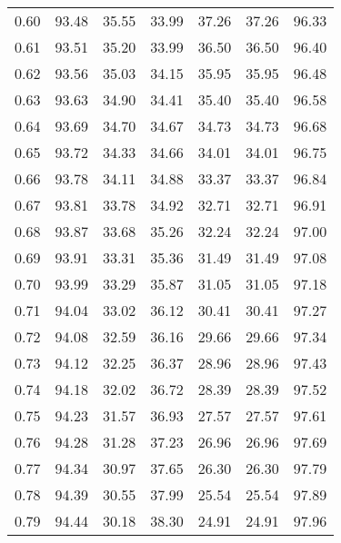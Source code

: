 \begin{tabular}{|c|c|c|c|c|c|c|}
      0.60 &     93.48 &     35.55 &      33.99 &   37.26 &      37.26 &         96.33 \\
      0.61 &     93.51 &     35.20 &      33.99 &   36.50 &      36.50 &         96.40 \\
      0.62 &     93.56 &     35.03 &      34.15 &   35.95 &      35.95 &         96.48 \\
      0.63 &     93.63 &     34.90 &      34.41 &   35.40 &      35.40 &         96.58 \\
      0.64 &     93.69 &     34.70 &      34.67 &   34.73 &      34.73 &         96.68 \\
      0.65 &     93.72 &     34.33 &      34.66 &   34.01 &      34.01 &         96.75 \\
      0.66 &     93.78 &     34.11 &      34.88 &   33.37 &      33.37 &         96.84 \\
      0.67 &     93.81 &     33.78 &      34.92 &   32.71 &      32.71 &         96.91 \\
      0.68 &     93.87 &     33.68 &      35.26 &   32.24 &      32.24 &         97.00 \\
      0.69 &     93.91 &     33.31 &      35.36 &   31.49 &      31.49 &         97.08 \\
      0.70 &     93.99 &     33.29 &      35.87 &   31.05 &      31.05 &         97.18 \\
      0.71 &     94.04 &     33.02 &      36.12 &   30.41 &      30.41 &         97.27 \\
      0.72 &     94.08 &     32.59 &      36.16 &   29.66 &      29.66 &         97.34 \\
      0.73 &     94.12 &     32.25 &      36.37 &   28.96 &      28.96 &         97.43 \\
      0.74 &     94.18 &     32.02 &      36.72 &   28.39 &      28.39 &         97.52 \\
      0.75 &     94.23 &     31.57 &      36.93 &   27.57 &      27.57 &         97.61 \\
      0.76 &     94.28 &     31.28 &      37.23 &   26.96 &      26.96 &         97.69 \\
      0.77 &     94.34 &     30.97 &      37.65 &   26.30 &      26.30 &         97.79 \\
      0.78 &     94.39 &     30.55 &      37.99 &   25.54 &      25.54 &         97.89 \\
      0.79 &     94.44 &     30.18 &      38.30 &   24.91 &      24.91 &         97.96 \\

\end{tabular}
